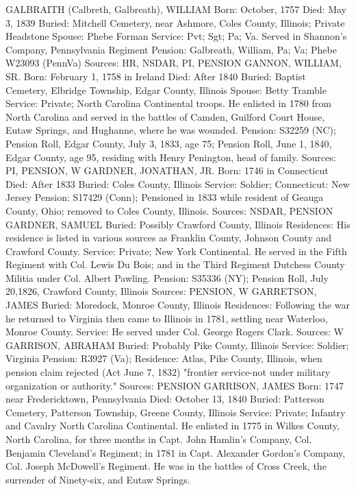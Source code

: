 GALBRAITH (Calbreth, Galbreath), WILLIAM 
Born: October, 1757 
Died: May 3, 1839 
Buried: Mitchell Cemetery, near Ashmore, Coles County, Illinois; Private Head­stone 
Spouse: Phebe Forman 
Service: Pvt; Sgt;  Pa; Va. Served in Shannon's Company, Pennsylvania Regiment 
Pension: Galbreath, William, Pa; Va; Phebe W23093 (PennVa) 
Sources: HR, NSDAR, PI, PENSION 
GANNON, WILLIAM, SR. 
Born: February 1, 1758 in Ireland 
Died: After 1840 
Buried: Baptist Cemetery, Elbridge Township, Edgar County, Illinois 
Spouse: Betty Tramble 
Service: Private; North Carolina Continental troops. He enlisted in 1780 from North Carolina and served in the battles of Camden, Guilford Court House, Eutaw Springs, and Hughanne, where he was wounded. 
Pension: S32259 (NC); Pension Roll, Edgar County, July 3, 1833, age 75; Pension Roll, June 1, 1840, Edgar County, age 95, residing with Henry Penington, head of family. 
Sources: PI, PENSION, W 
GARDNER, JONATHAN, JR. 
Born: 1746 in Connecticut 
Died: After 1833 
Buried: Coles County, Illinois 
Service: Soldier; Connecticut: New Jersey 
Pension: S17429 (Conn); Pensioned in 1833 while resident of Geauga County, Ohio; removed to Coles County, Illinois. 
Sources: NSDAR, PENSION 
GARDNER, SAMUEL 
Buried: Possibly Crawford County, Illinois 
Residences: His residence is listed in various sources as Franklin County, John­son County and Crawford County. 
Service: Private; New York Continental. He served in the Fifth Regiment with Col. Lewis Du Bois; and in the Third Regiment Dutchess County Militia under Col. Albert Pawling. 
Pension: S35336 (NY); Pension Roll, July 20,1826, Crawford County, Illinois 
Sources: PENSION, W 
GARRETSON, JAMES 
Buried: Moredock, Monroe County, Illinois 
Residences: Following the war he returned to Virginia then came to Illinois in 1781, settling near Waterloo, Monroe County. 
Service: He served under Col. George Rogers Clark. Sources: W 
GARRISON, ABRAHAM 
Buried: Probably Pike County, Illinois 
Service: Soldier; Virginia Pension: R3927 (Va); 
Residence: Atlas, Pike County, Illinois, when pension claim rejected (Act June 7, 1832) "frontier service-not under military organization or authority." 
Sources: PENSION 
GARRISON, JAMES 
Born: 1747 near Fredericktown, Pennsylvania 
Died: October 13, 1840 Buried: Patterson Cemetery, Patterson Township, Greene County, Illinois 
Service: Private; Infantry and Cavalry North Carolina Continental. He enlisted in 1775 in Wilkes County, North Carolina, for three months in Capt. John Hamlin's Company, Col. Benjamin Cleveland's Regiment; in 1781 in Capt. Alexander Gordon's Company, Col. Joseph McDowell's Regiment. He was in the battles of Cross Creek, the surrender of Ninety-six, and Eutaw Springs. 
